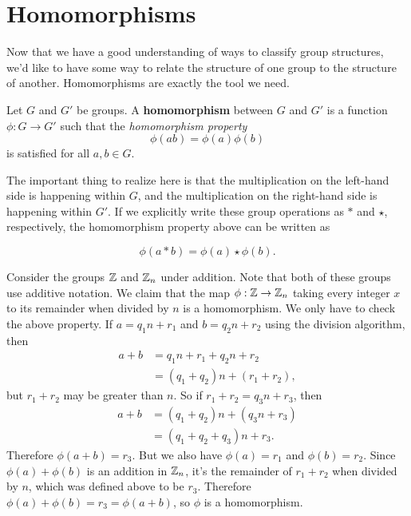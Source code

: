 \section{Homomorphisms}

Now that we have a good understanding of ways to classify group structures, we'd like to have some way to relate the structure of one group to the structure of another. Homomorphisms are exactly the tool we need. 

\begin{definition}
Let $G$ and $G'$ be groups. A \textbf{homomorphism} between $G$ and $G'$ is a function $\phi: G \to G'$ such that the \textit{homomorphism property}
\begin{equation*}
    \phi(ab) = \phi(a)\phi(b)
\end{equation*}
is satisfied for all $a, b \in G$.
\end{definition}

The important thing to realize here is that the multiplication on the left-hand side is happening within $G$, and the multiplication on the right-hand side is happening within $G'$. If we explicitly write these group operations as $*$ and $\star$, respectively, the homomorphism property above can be written as

\begin{equation*}
    \phi(a*b) = \phi(a) \star \phi(b).
\end{equation*}

\begin{example}
\label{zn_homomorphism}
Consider the groups $\z$ and $\zn[n]$ under addition. Note that both of these groups use additive notation. We claim that the map $\phi: \z \to \zn[n]$ taking every integer $x$ to its remainder when divided by $n$ is a homomorphism. We only have to check the above property. If $a = q_1n + r_1$ and $b = q_2n + r_2$ using the division algorithm, then
\begin{align*}
    a + b &= q_1n + r_1 + q_2n + r_2 \\
          &= (q_1 + q_2)n + (r_1 + r_2),
\end{align*}
but $r_1 + r_2$ may be greater than $n$. So if $r_1 + r_2 = q_3n + r_3$, then 
\begin{align*}
    a + b &= (q_1 + q_2)n + (q_3n + r_3)  \\
          &= (q_1 + q_2 + q_3)n + r_3.
\end{align*}
Therefore $\phi(a + b) = r_3$. But we also have $\phi(a) = r_1$ and $\phi(b) = r_2$. Since $\phi(a) + \phi(b)$ is an addition in $\zn[n]$, it's the remainder of $r_1 + r_2$ when divided by $n$, which was defined above to be $r_3$. Therefore $\phi(a) + \phi(b) = r_3 = \phi(a + b)$, so $\phi$ is a homomorphism.
\end{example}

